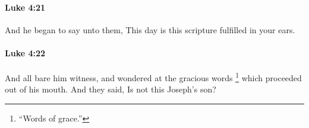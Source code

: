 		\paragraph{Luke 4:21} %
			\label{LUKE-4-21}

			And he began to say unto them, This day is this scripture fulfilled in your ears.

			\begin{framed}
			\scriptsize
				\begin{compactdesc}
					\item[SBLG] 
				\end{compactdesc}
			\end{framed}

		\paragraph{Luke 4:22} %
			\label{LUKE-4-22}

			And all bare him witness, and wondered at the gracious words%
				\footnote{%
					``Words of grace.''
					}
			which proceeded out of his mouth. And they said, Is not this Joseph's son?

